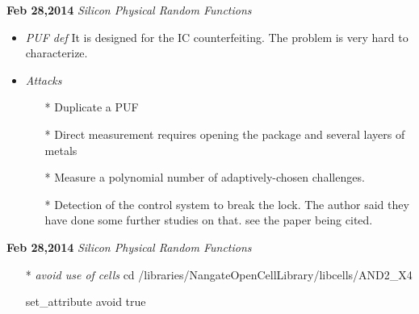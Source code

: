 \documentclass[]{article}
\begin{document}
\noindent \textbf{Feb 28,2014}
\textit{Silicon Physical Random Functions}
\indent		\begin{itemize}
                \item \textit{PUF def} It is designed for the IC counterfeiting.
                The problem is very hard to characterize.
                \item \textit{Attacks}
                    \begin{itemize}
                        \item [*] Duplicate a PUF
                        \item [*] Direct measurement requires opening the
                        package and several layers of metals
                        \item [*] Measure a polynomial number of
                        adaptively-chosen challenges.
                        \item [*] Detection of the control system to break the
                        lock. The author said they have done some further
                        studies on that. see the paper being cited.
                    \end{itemize}
        \end{itemize}

\noindent \textbf{Feb 28,2014}
\textit{Silicon Physical Random Functions}
\indent		\begin{itemize}
            \item [*] \textit{avoid use of cells} cd
            /libraries/NangateOpenCellLibrary/libcells/AND2\_X4

                                            set\_attribute avoid true
        \end{itemize}
\end{document}
